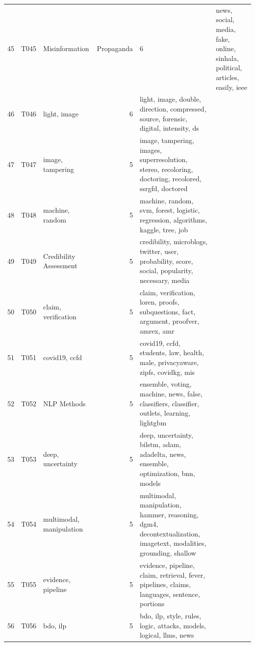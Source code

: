 \begin{tabular}{rllrl}
45 & T045 & Misinformation & Propaganda & 6 & news, social, media, fake, online, sinhala, political, articles, easily, ieee \\
46 & T046 & light, image & 6 & light, image, double, direction, compressed, source, forensic, digital, intensity, ds \\
47 & T047 & image, tampering & 5 & image, tampering, images, superresolution, stereo, recoloring, doctoring, recolored, ssrgfd, doctored \\
48 & T048 & machine, random & 5 & machine, random, svm, forest, logistic, regression, algorithms, kaggle, tree, job \\
49 & T049 & Credibility Assessment & 5 & credibility, microblogs, twitter, user, probability, score, social, popularity, necessary, media \\
50 & T050 & claim, verification & 5 & claim, verification, loren, proofs, subquestions, fact, argument, proofver, amrex, amr \\
51 & T051 & covid19, ccfd & 5 & covid19, ccfd, students, law, health, male, privacyaware, zipfs, covidkg, mis \\
52 & T052 & NLP Methods & 5 & ensemble, voting, machine, news, false, classifiers, classifier, outlets, learning, lightgbm \\
53 & T053 & deep, uncertainty & 5 & deep, uncertainty, bilstm, adam, adadelta, news, ensemble, optimization, bnn, models \\
54 & T054 & multimodal, manipulation & 5 & multimodal, manipulation, hammer, reasoning, dgm4, decontextualization, imagetext, modalities, grounding, shallow \\
55 & T055 & evidence, pipeline & 5 & evidence, pipeline, claim, retrieval, fever, pipelines, claims, languages, sentence, portions \\
56 & T056 & bdo, ilp & 5 & bdo, ilp, style, rules, logic, attacks, models, logical, llms, news \\
\bottomrule
\end{tabular}
